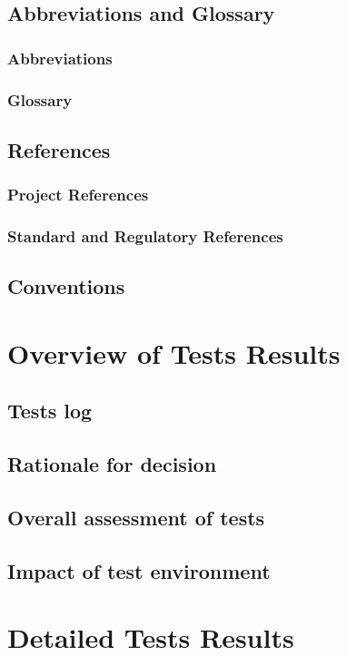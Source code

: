 \documentclass[runningheads,a4paper]{article}
\begin{document}
	\subsection{Abbreviations and Glossary}
		\subsubsection{Abbreviations}

		\subsubsection{Glossary}

	\subsection{References}
		\subsubsection{Project References}

		\subsubsection{Standard and Regulatory References}

	\subsection{Conventions}

\section{Overview of Tests Results}
	\subsection{Tests log}

	\subsection{Rationale for decision}

	\subsection{Overall assessment of tests}

	\subsection{Impact of test environment}

\section{Detailed Tests Results}
	
\end{document}
